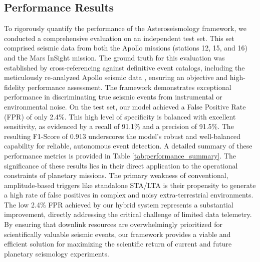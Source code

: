 \documentclass[conference]{IEEEtran}
\begin{document}
        \subsection{Performance Results}
        
                To rigorously quantify the performance of the Asteroseismology framework, we conducted a comprehensive evaluation on
        an independent test set. This set comprised seismic data from both the Apollo missions (stations 12, 15, and 16) and the
        Mars InSight mission. The ground truth for this evaluation was established by cross-referencing against definitive event
        catalogs, including the meticulously re-analyzed Apollo seismic data \cite{Weber2015}, ensuring an objective and
        high-fidelity performance assessment. The framework demonstrates exceptional performance in discriminating true seismic
        events from instrumental or environmental noise. On the test set, our model achieved a False Positive Rate (FPR) of only
        2.4\%. This high level of specificity is balanced with excellent sensitivity, as evidenced by a recall of 91.1\% and a
        precision of 91.5\%. The resulting F1-Score of 0.913 underscores the model's robust and well-balanced capability for
        reliable, autonomous event detection. A detailed summary of these performance metrics is provided in Table
        \ref{tab:performance_summary}. The significance of these results lies in their direct application to the operational
        constraints of planetary missions. The primary weakness of conventional, amplitude-based triggers like standalone STA/LTA is
        their propensity to generate a high rate of false positives in complex and noisy extra-terrestrial environments. The low
        2.4\% FPR achieved by our hybrid system represents a substantial improvement, directly addressing the critical challenge of
        limited data telemetry. By ensuring that downlink resources are overwhelmingly prioritized for scientifically valuable
        seismic events, our framework provides a viable and efficient solution for maximizing the scientific return of current and
        future planetary seismology experiments.
                
\end{document}
